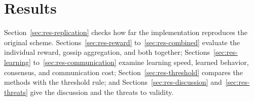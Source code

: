\chapter{Results}
\label{chap:results}

Section~\ref{sec:res-replication} checks how far the implementation reproduces the original scheme.
Sections~\ref{sec:res-reward} to~\ref{sec:res-combined} evaluate the individual reward, gossip aggregation, and
both together; Sections~\ref{sec:res-learning} to~\ref{sec:res-communication} examine learning speed, learned
behavior, consensus, and communication cost; Section~\ref{sec:res-threshold} compares the methods with the
threshold rule; and Sections~\ref{sec:res-discussion} and~\ref{sec:res-threats} give the discussion and the
threats to validity.


